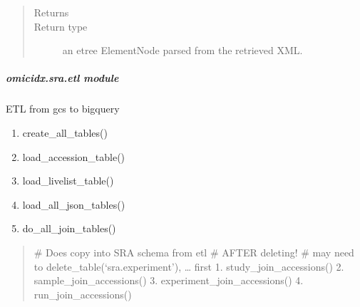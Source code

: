\documentclass[letterpaper,10pt,english]{sphinxmanual}
\begin{document}
\begin{fulllineitems}
\begin{fulllineitems}
\begin{quote}
\begin{description}
\item[{Returns}] \leavevmode


\item[{Return type}] \leavevmode
an etree ElementNode parsed from the retrieved XML.

\end{description}\end{quote}

\end{fulllineitems}


\end{fulllineitems}



\subparagraph{omicidx.sra.etl module}
\label{\detokenize{omicidx.sra.etl:module-omicidx.sra.etl}}\label{\detokenize{omicidx.sra.etl:omicidx-sra-etl-module}}\label{\detokenize{omicidx.sra.etl::doc}}
ETL from gcs to bigquery
\begin{enumerate}
\def\theenumi{\arabic{enumi}}
\def\labelenumi{\theenumi .}
\makeatletter\def\p@enumii{\p@enumi \theenumi .}\makeatother
\item {} 
create\_all\_tables()

\item {} 
load\_accession\_table()

\item {} 
load\_livelist\_table()

\item {} 
load\_all\_json\_tables()

\item {} 
do\_all\_join\_tables()

\end{enumerate}
\begin{quote}

\# Does copy into SRA schema from etl
\#   AFTER deleting!
\# may need to delete\_table(‘sra.experiment’), … first
1. study\_join\_accessions()
2. sample\_join\_accessions()
3. experiment\_join\_accessions()
4. run\_join\_accessions()
\end{quote}

\begin{fulllineitems}
\label{\detokenize{omicidx.sra.etl:omicidx.sra.etl.create_all_tables}}
\end{fulllineitems}
\end{document}

